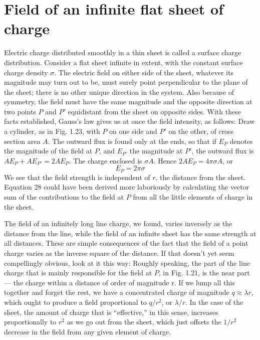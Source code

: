 \section{Field of an infinite flat sheet of charge}

Electric charge distributed smoothly in a thin sheet is called a
surface charge distribution. Consider a flat sheet infinite in extent,
with the constant surface charge density $\sigma$. The electric field on
either side of the sheet, whatever its magnitude may turn out to be,
must surely point perpendicular to the plane of the sheet; there is no
other unique direction in the system. Also because of symmetry,
the field must have the same magnitude and the opposite direction at
two points $P$ and $P'$ equidistant from the sheet on opposite sides.
With these facts established, Gauss's law gives us at once the field
intensity, as follows: Draw a cylinder, as in Fig. 1.23, with $P$ on one
side and $P'$ on the other, of cross section area $A$. The outward flux
is found only at the ends, so that if $E_P$ denotes the magnitude of the
field at $P$, and $E_{P'}$ the magnitude at $P'$, the outward flux is
$AE_P+AE_{P'}=2AE_P$. The charge enclosed is $\sigma A$. Hence
$2AE_P=4\pi\sigma A$, or
\begin{equation}
  E_P = 2\pi\sigma
\end{equation}
We see that the field strength is independent of $r$, the distance from
the sheet. Equation 28 could have been derived more laboriously
by calculating the vector sum of the contributions to the field at $P$
from all the little elements of charge in the sheet.

The field of an infinitely long line charge, we found, varies inversely
as the distance from the line, while the field of an infinite sheet has
the same strength at all distances. These are simple consequences
of the fact that the field of a point charge varies as the inverse square
of the distance. If that doesn't yet seem compellingly obvious, look
at it this way: Roughly speaking, the part of the line charge that is
mainly responsible for the field at $P$, in Fig. 1.21, is the near part---
the charge within a distance of order of magnitude r. If we lump all
this together and forget the rest, we have a concentrated charge of
magnitude $q\approx\lambda r$, which ought to produce a field proportional to
$q/r^2$, or $\lambda/r$. In the case of the sheet, the amount of charge that is
``effective,'' in this sense, increases proportionally to $r^2$ as we go out
from the sheet, which just offsets the $1/r^2$ decrease in the field from
any given element of charge.
